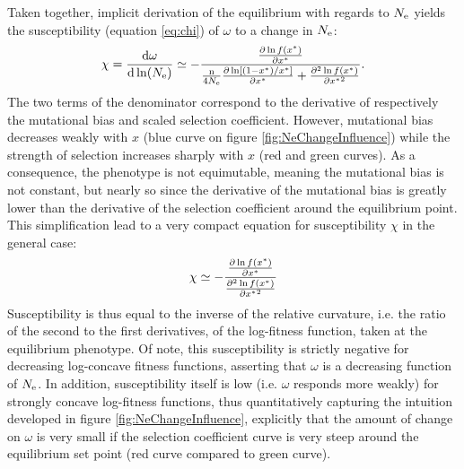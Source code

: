 Taken together, implicit derivation of the equilibrium with regards to $N_{\mathrm{e}}$ yields the susceptibility (equation \ref{eq:chi}) of $\omega$ to a change in $N_{\mathrm{e}}$:
\begin{gather}
 \chi = \frac{ \mathrm{d} \omega}{\mathrm{d} \ln (N_{\mathrm{e}})} \simeq - \frac{\frac{ \partial \ln f(x^{*}) }{\partial {x^{*}}}}{\frac{\text{n}}{4 N_{\mathrm{e}}} \frac{\partial \ln [ (1 - x^{*}) / x^{*} ]}{\partial x^{*} } + \frac{ \partial^2 \ln f(x^{*}) }{\partial {x^{*}}^2}}.
\end{gather}
The two terms of the denominator correspond to the derivative of respectively the mutational bias and scaled selection coefficient.
However, mutational bias decreases weakly with $x$ (blue curve on figure \ref{fig:NeChangeInfluence}) while the strength of selection increases sharply with $x$ (red and green curves).
As a consequence, the phenotype is not equimutable, meaning the mutational bias is not constant, but nearly so since the derivative of the mutational bias is greatly lower than the derivative of the selection coefficient around the equilibrium point. 
This simplification lead to a very compact equation for susceptibility $\chi$ in the general case: 
\begin{gather}
\chi \simeq - \frac{\frac{ \partial \ln f(x^{*}) }{\partial {x^{*}}}}{\frac{ \partial^2 \ln f(x^{*}) }{\partial {x^{*}}^2}}
\end{gather}
Susceptibility is thus equal to the inverse of the relative curvature, i.e. the ratio of the second to the first derivatives, of the log-fitness function, taken at the equilibrium phenotype.
Of note, this susceptibility is strictly negative for decreasing log-concave fitness functions, asserting that $\omega$ is a decreasing function of $N_{\mathrm{e}}$.
In addition, susceptibility itself is low (i.e. $\omega$ responds more weakly) for strongly concave log-fitness functions, thus quantitatively capturing the intuition developed in figure \ref{fig:NeChangeInfluence}, explicitly that the amount of change on $\omega$ is very small if the selection coefficient curve is very steep around the equilibrium set point (red curve compared to green curve).


